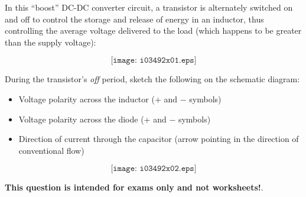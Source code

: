 

In this ``boost'' DC-DC converter circuit, a transistor is alternately switched on and off to control the storage and release of energy in an inductor, thus controlling the average voltage delivered to the load (which happens to be greater than the supply voltage):

$$\texttt{[image: i03492x01.eps]}$$

During the transistor's {\it off} period, sketch the following on the schematic diagram:

\begin{itemize}
\item{} Voltage polarity across the inductor (+ and $-$ symbols)
\vskip 5pt
\item{} Voltage polarity across the diode (+ and $-$ symbols)
\vskip 5pt
\item{} Direction of current through the capacitor (arrow pointing in the direction of conventional flow)
\end{itemize}







$$\texttt{[image: i03492x02.eps]}$$







{\bf This question is intended for exams only and not worksheets!}.


